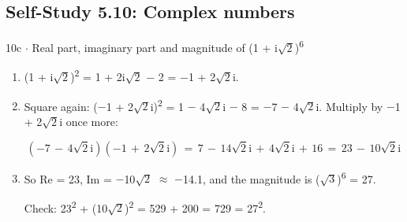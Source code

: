 \documentclass[11pt]{article}
\begin{document}
\begin{keepsection}\subsection{Self-Study 5.10: Complex numbers}

\begin{workedbox}{10c \ensuremath{\cdot} Real part, imaginary part and magnitude of (1 + i\ensuremath{\sqrt{2}})\textsuperscript{6}}
\begin{enumerate}
\item (1 + i\ensuremath{\sqrt{2}})\textsuperscript{2} = 1 + 2i\ensuremath{\sqrt{2}} \ensuremath{-} 2 = \ensuremath{-}1 + 2\ensuremath{\sqrt{2}}i.
\item {}
Square again: (\ensuremath{-}1 + 2\ensuremath{\sqrt{2}}i)\textsuperscript{2} = 1 \ensuremath{-} 4\ensuremath{\sqrt{2}}i \ensuremath{-} 8 = \ensuremath{-}7 \ensuremath{-} 4\ensuremath{\sqrt{2}}i. Multiply by \ensuremath{-}1 + 2\ensuremath{\sqrt{2}}i once more:

\begin{equation*}(-7\, -\, 4\sqrt{2}\mathrm{i})(-1\, +\, 2\sqrt{2}\mathrm{i})\, =\, 7\, -\, 14\sqrt{2}\mathrm{i}\, +\, 4\sqrt{2}\mathrm{i}\, +\, 16\, =\, 23\, -\, 10\sqrt{2}\mathrm{i}\end{equation*}
\item {}
So Re = 23, Im = \ensuremath{-}10\ensuremath{\sqrt{2}} \ensuremath{\approx} \ensuremath{-}14.1, and the magnitude is (\ensuremath{\sqrt{3}})\textsuperscript{6} = 27.

Check: 23\textsuperscript{2} + (10\ensuremath{\sqrt{2}})\textsuperscript{2} = 529 + 200 = 729 = 27\textsuperscript{2}.
\end{enumerate}
\end{workedbox}

\end{keepsection}
\end{document}
